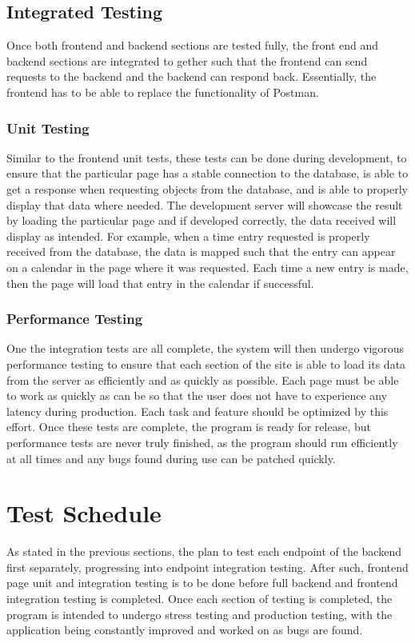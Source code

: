 {{{{{{{\subsection{Integrated Testing}
Once both frontend and backend sections are tested fully, the front end and backend sections are integrated to gether such that the frontend can send requests to the backend and the backend can respond back. Essentially, the frontend has to be able to replace the functionality of Postman. 

\subsubsection{Unit Testing}
Similar to the frontend unit tests, these tests can be done during development, to ensure that the particular page has a stable connection to the database, is able to get a response when requesting objects from the database, and is able to properly  display that data where needed. The development server will showcase the result by loading the particular page and if developed correctly, the data received will display as intended. For example, when a time entry requested is properly received from the database, the data is mapped such that the entry can appear on a calendar in the page where it was requested. Each time a new entry is made, then the page will load that entry in the calendar if successful. 

\subsubsection{Performance Testing}
One the integration tests are all complete, the system will then undergo vigorous performance testing to ensure that each section of the site is able to load its data from the server as efficiently and as quickly as possible. Each page must be able to work as quickly as can be so that the user does not have to experience any latency during production. Each task and feature should be optimized by this effort. Once these tests are complete, the program is ready for release, but performance tests are never truly finished, as the program should run efficiently at all times and any bugs found during use can be patched quickly. 

\newpage
\section{Test Schedule}
As stated in the previous sections, the plan to test each endpoint of the backend first separately, progressing into endpoint integration testing. After such, frontend page unit and integration testing is to be done before full backend and frontend integration testing is completed. Once each section of testing is completed, the program is intended to undergo stress testing and production testing, with the application being constantly improved and worked on as bugs are found.

}}}}}}}
